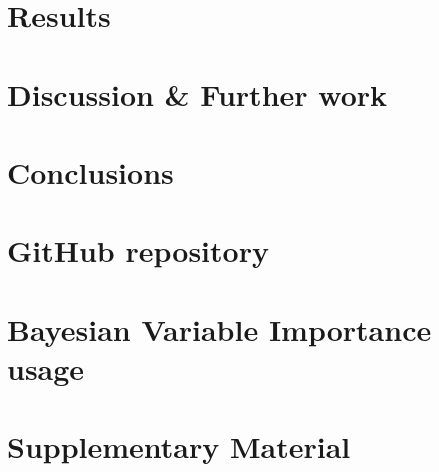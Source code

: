 \documentclass[a4paper, 12pt, openany]{book} %
\begin{document}
\chapter{Results}
\label{ch:results}

\cleardoublepage

%

%


\chapter{Discussion \& Further work}
\label{ch:discussion}

\cleardoublepage


\chapter{Conclusions}
\label{ch:conclusion}

\cleardoublepage


\cleardoublepage


\appendix
{}
\chapter{GitHub repository}
\label{ap:github-repository}


\chapter{Bayesian Variable Importance usage}
\label{ap:bayesian-importance}


\chapter{Supplementary Material}
\label{ap:tables}

\end{document}
